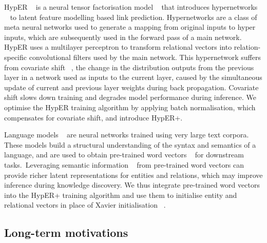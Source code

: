 \noindent HypER \unskip~\citep{balazevic2019hypernetwork} is a neural tensor factorisation model \unskip~\citep{wu2018neural} that introduces hypernetworks \unskip~\citep{ha2016hypernetworks} to latent feature modelling based link prediction. Hypernetworks are a class of meta neural networks used to generate a mapping from original inputs to hyper inputs, which are subsequently used in the forward pass of a main network. HypER uses a multilayer perceptron to transform relational vectors into relation-specific convolutional filters used by the main network. This hypernetwork suffers from covariate shift \unskip~\citep{ioffe2015batch}, the change in the distribution outputs from the previous layer in a network used as inputs to the current layer, caused by the simultaneous update of current and previous layer weights during back propagation. Covariate shift slows down training and degrades model performance during inference. We optimise the HypER training algorithm by applying batch normalisation, which compensates for covariate shift, and introduce HypER+. \par

\noindent Language models \unskip~\citep{turian2010word} are neural networks trained using very large text corpora. These models build a structural understanding of the syntax and semantics of a language, and are used to obtain pre-trained word vectors \unskip~\citep{mikolov2013distributed} for downstream tasks.\ Leveraging semantic information \unskip~\citep{socher2013reasoning} from pre-trained word vectors can provide richer latent representations for entities and relations, which may improve inference during knowledge discovery. We thus integrate pre-trained word vectors into the HypER+ training algorithm and use them to initialise entity and relational vectors in place of Xavier initialisation \unskip~\citep{glorot2010understanding}. 

\subsection{Long-term motivations} 

